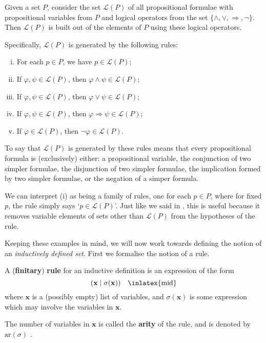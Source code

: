 \begin{example}
\label{exPropositionalFormulaeAsInductivelyDefinedSetPreliminary}
Given a set $P$, consider the set $\mathcal{L}(P)$ of all propositional formulae with propositional variables from $P$ and logical operators from the set $\{ {\wedge}, {\vee}, {\Rightarrow}, {\neg} \}$. Then $\mathcal{L}(P)$ is built out of the elements of $P$ using these logical operators.

Specifically, $\mathcal{L}(P)$ is generated by the following rules:
\begin{enumerate}[(i)]
\item For each $p \in P$, we have $p \in \mathcal{L}(P)$;
\item If $\varphi, \psi \in \mathcal{L}(P)$, then $\varphi \wedge \psi \in \mathcal{L}(P)$;
\item If $\varphi, \psi \in \mathcal{L}(P)$, then $\varphi \vee \psi \in \mathcal{L}(P)$;
\item If $\varphi, \psi \in \mathcal{L}(P)$, then $\varphi \Rightarrow \psi \in \mathcal{L}(P)$;
\item If $\varphi \in \mathcal{L}(P)$, then $\neg \varphi \in \mathcal{L}(P)$.
\end{enumerate}

To say that $\mathcal{L}(P)$ is generated by these rules means that every propositional formula is (exclusively) either: a propositional variable, the conjunction of two simpler formulae, the disjunction of two simpler formulae, the implication formed by two simpler formulae, or the negation of a simper formula.

We can interpret (i) as being a family of rules, one for each $p \in P$, where for fixed $p$, the rule simply says `$p \in \mathcal{L}(P)$'. Just like we said in , this is useful because it removes variable elements of sets other than $\mathcal{L}(P)$ from the hypotheses of the rule.
\end{example}

Keeping these examples in mind, we will now work towards defining the notion of an \textit{inductively defined set}. First we formalise the notion of a rule.

\begin{definition}
\label{defRuleForInductiveDefinition}
A (\textbf{finitary}) \textbf{rule} for an inductive definition is an expression of the form
\[ (\mathbf{x} \mid \sigma(\mathbf{x})) \quad \text{\inlatex{mid}} \]
where $\mathbf{x}$ is a (possibly empty) list of variables, and $\sigma(\mathbf{x})$ is some expression which may involve the variables in $\mathbf{x}$.

The number of variables in $\mathbf{x}$ is called the \textbf{arity} of the rule, and is denoted by $\mathrm{ar}(\sigma)$ .
\end{definition}

